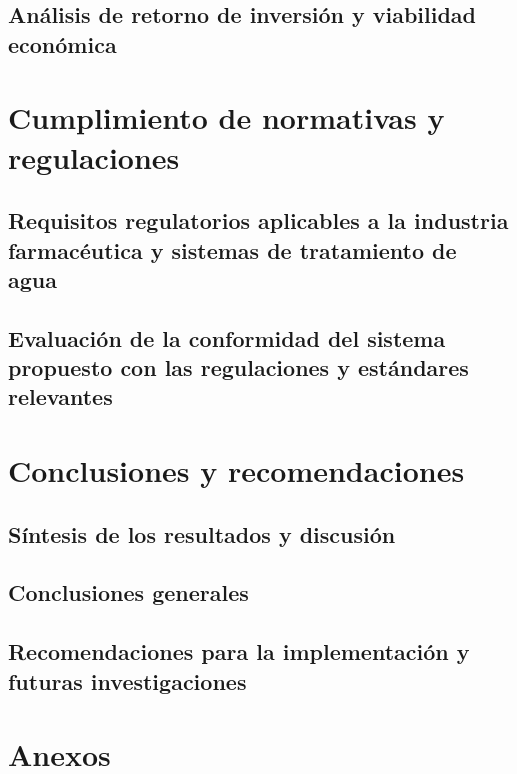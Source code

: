 \documentclass[
	spanish, %
	letterpaper, oneside
]{book}
\begin{document}
\section{Análisis de retorno de inversión y viabilidad económica}

\chapter{Cumplimiento de normativas y regulaciones}
\section{Requisitos regulatorios aplicables a la industria farmacéutica y sistemas de tratamiento de agua}
\section{ Evaluación de la conformidad del sistema propuesto con las regulaciones y estándares relevantes}

\chapter{Conclusiones y recomendaciones}
\section*{Síntesis de los resultados y discusión}
\section*{Conclusiones generales}
\section*{Recomendaciones para la implementación y futuras investigaciones}
\cite{bluegoldSistemaElectrodesionizacionEDI2021}


\chapter{Anexos}



\end{document}
